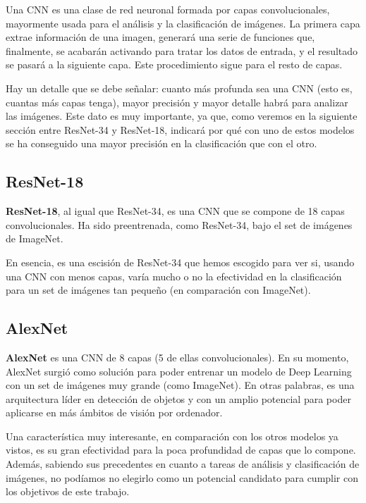 Una \ac{CNN} es una clase de red neuronal formada por capas convolucionales, mayormente usada para el análisis y la clasificación de imágenes. La primera capa extrae información de una imagen, generará una serie de funciones que, finalmente, se acabarán activando para tratar los datos de entrada, y el resultado se pasará a la siguiente capa. Este procedimiento sigue para el resto de capas.

Hay un detalle que se debe señalar: cuanto más profunda sea una \ac{CNN} (esto es, cuantas más capas tenga), mayor precisión y mayor detalle habrá para analizar las imágenes. Este dato es muy importante, ya que, como veremos en la siguiente sección entre ResNet-34 y ResNet-18, indicará por qué con uno de estos modelos se ha conseguido una mayor precisión en la clasificación que con el otro. %

\subsection{ResNet-18}

\textbf{ResNet-18}, al igual que ResNet-34, es una \ac{CNN} que se compone de 18 capas convolucionales. Ha sido preentrenada, como ResNet-34, bajo el set de imágenes de ImageNet.

En esencia, es una escisión de ResNet-34 que hemos escogido para ver si, usando una \ac{CNN} con menos capas, varía mucho o no la efectividad en la clasificación para un set de imágenes tan pequeño (en comparación con ImageNet).

\subsection{AlexNet}

\textbf{AlexNet} es una \ac{CNN} de 8 capas (5 de ellas convolucionales). En su momento, AlexNet surgió como solución para poder entrenar un modelo de Deep Learning con un set de imágenes muy grande (como ImageNet). En otras palabras, es una arquitectura líder en detección de objetos y con un amplio potencial para poder aplicarse en más ámbitos de visión por ordenador.

Una característica muy interesante, en comparación con los otros modelos ya vistos, es su gran efectividad para la poca profundidad de capas que lo compone. Además, sabiendo sus precedentes en cuanto a tareas de análisis y clasificación de imágenes, no podíamos no elegirlo como un potencial candidato para cumplir con los objetivos de este trabajo.

